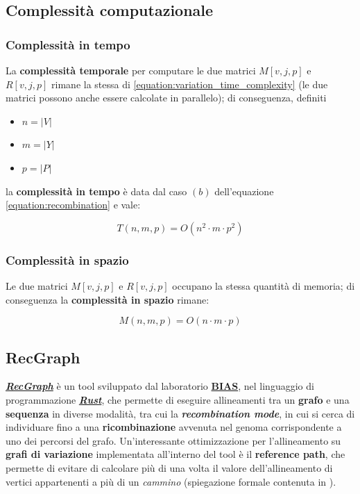 \subsection{Complessità computazionale}
\subsubsection{Complessità in tempo}
    La \textbf{complessità temporale} per computare le due matrici $M[v, j, p]$ e $R[v, j, p]$ rimane la stessa di \ref{equation:variation_time_complexity} (le due matrici possono anche essere calcolate in parallelo); di conseguenza, definiti
    \begin{itemize}
        \item $n = \lvert V \rvert$
        \item $m = \lvert Y \rvert$
        \item $p = \lvert P \rvert$
    \end{itemize}
    la \textbf{complessità in tempo} è data dal caso $(b)$ dell'equazione \ref{equation:recombination} e vale:

    \begin{equation}
        T(n, m, p) = O(n^2 \cdot m \cdot p^2)
        \label{equation:recombination_time_complexity}
    \end{equation}

\subsubsection{Complessità in spazio}
    Le due matrici $M[v, j, p]$ e $R[v, j, p]$ occupano la stessa quantità di memoria; di conseguenza la \textbf{complessità in spazio} rimane:

    \begin{equation}
        M(n, m, p) = O(n \cdot m \cdot p)
        \label{equation:recombination_space_complexity}
    \end{equation}

\subsection{RecGraph}
\label{section:recgraph}
    \href{https://github.com/AlgoLab/RecGraph}{\textbf{\textit{RecGraph}}} è un tool sviluppato dal laboratorio \href{https://algolab.eu/}{\textbf{BIAS}}, nel linguaggio di programmazione \href{https://www.rust-lang.org/it}{\textbf{\textit{Rust}}}, che permette di eseguire allineamenti tra un \textbf{grafo} e una \textbf{sequenza} in diverse modalità, tra cui la \textbf{\textit{recombination mode}}, in cui si cerca di individuare fino a una \textbf{ricombinazione} avvenuta nel genoma corrispondente a uno dei percorsi del grafo. Un'interessante ottimizzazione per l'allineamento su \textbf{grafi di variazione} implementata all'interno del tool è il \textbf{reference path}, che permette di evitare di calcolare più di una volta il valore dell'allineamento di vertici appartenenti a più di un \emph{cammino} (spiegazione formale contenuta in \cite{Recgraph}).    

